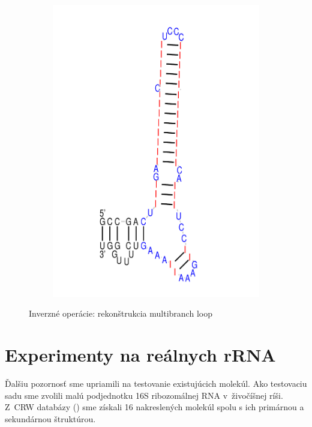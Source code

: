 \begin{figure}[t!H]
\begin{subfigure}[t]{0.3\textwidth}
    \includegraphics[clip, trim=0 0 0 2cm, width=1\textwidth]{../img/alg/insert/3/multibranch-del-ins}
    \caption{}
    \label{obr:delete_insert_multibranch_loop_c}
  \end{subfigure}
  \caption{Inverzné operácie: rekonštrukcia multibranch loop}
  \label{obr:delete_insert_multibranch_loop}
\end{figure}




\section{Experimenty na reálnych rRNA}

Ďalšiu pozornosť sme upriamili na testovanie existujúcich molekúl.
Ako testovaciu sadu sme zvolili malú podjednotku 16S ribozomálnej RNA
v~živočíšnej ríši.
Z~CRW databázy (\citet{CRW}) sme získali 16 nakreslených molekúl spolu s ich
primárnou a sekundárnou štruktúrou.

